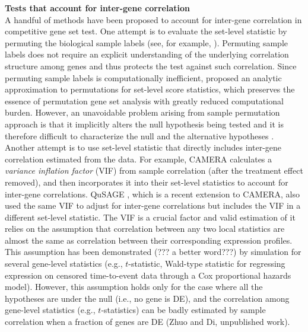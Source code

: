 \documentclass[useAMS,usenatbib, galley]{biom}
\newcommand{\thepapertobefinished}{Zhuo and Di, unpublished work}
\begin{document}
	\textbf{Tests that account for inter-gene correlation}\\
	A handful of methods have been proposed to account for inter-gene correlation in competitive gene set test. One attempt is to evaluate the set-level statistic by permuting the biological sample labels (see, for example, \cite{subramanian2005gene, efron2007testing}). Permuting sample labels does not require an explicit understanding of the underlying correlation structure among genes and thus protects the test against such correlation. Since permuting sample labels is computationally inefficient, \cite{zhou2013empirical} proposed an analytic approximation to permutations for set-level score statistics, which preserves the essence of permutation gene set analysis with greatly reduced computational burden. However, an unavoidable problem arising from sample permutation approach is that it implicitly alters the null hypothesis being tested and it is therefore difficult to characterize the null and the alternative hypotheses \citep{goeman2007analyzing, khatri2012ten, wu2012camera}. Another attempt is to use set-level statistic that directly includes inter-gene correlation estimated from the data. For example, CAMERA \citep{wu2012camera} calculates a \textit{variance inflation factor} (VIF) from sample correlation (after the treatment effect removed), and then incorporates it into their set-level statistics to account for inter-gene correlations. QuSAGE \citep{yaari2013quantitative}, which is a recent extension to CAMERA, also used the same VIF to adjust for inter-gene correlations but includes the VIF in a different set-level statistic. The VIF is a crucial factor and valid estimation of it relies on the assumption that correlation between any two local statistics are almost the same as correlation between their corresponding expression profiles. This assumption has been demonstrated (??? a better word???) by simulation \citep{barry2008statistical} for several gene-level statistics (e.g., $t$-statistic, Wald-type statistic for regressing expression on censored time-to-event data through a Cox proportional hazards model). However, this assumption holds only for the case where all the hypotheses are under the null (i.e., no gene is DE), and the correlation among gene-level statistics (e.g., $t$-statistics) can be badly estimated by sample correlation when a fraction of genes are DE (\thepapertobefinished). 
	
\end{document}
